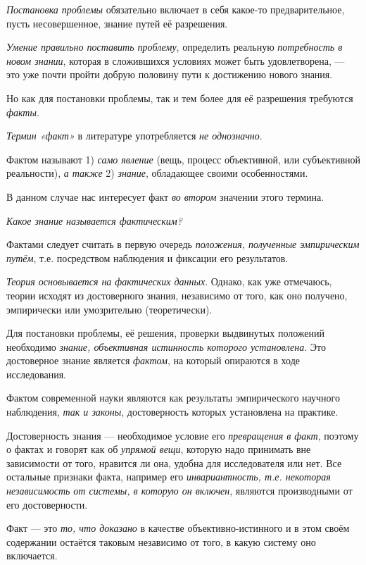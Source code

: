 \documentclass[a4paper,14pt,russian]{extreport}
\begin{document}
\emph{Постановка проблемы} обязательно включает в себя какое-то предварительное, пусть несовершенное, знание путей её разрешения.

\emph{Умение правильно поставить проблему}, определить реальную \emph{потребность в новом знании}, которая в сложившихся условиях может быть удовлетворена, --- это уже почти пройти добрую половину пути к достижению нового знания.

Но как для постановки проблемы, так и тем более для её разрешения требуются \emph{факты}.

\emph{Термин «факт»} в литературе употребляется \emph{не однозначно}.

Фактом называют 1) \emph{само явление} (вещь, процесс объективной, или субъективной реальности), \emph{а также} 2) \emph{знание}, обладающее своими особенностями.

В данном случае нас интересует факт \emph{во втором} значении этого термина.

\emph{Какое знание называется фактическим?}

Фактами следует считать в первую очередь \emph{положения, полученные эмпирическим путём}, т.е. посредством наблюдения и фиксации его результатов.

\emph{Теория основывается на фактических данных}. Однако, как уже отмечаюсь, теории исходят из достоверного знания, независимо от того, как оно получено, эмпирически или умозрительно (теоретически).

Для постановки проблемы, её решения, проверки выдвинутых положений необходимо \emph{знание, объективная истинность которого установлена}. Это достоверное знание является \emph{фактом}, на который опираются в ходе исследования.

Фактом современной науки являются как результаты эмпирического научного наблюдения, \emph{так и законы}, достоверность которых установлена на практике.

Достоверность знания --- необходимое условие его \emph{превращения в факт}, поэтому о фактах и говорят как об \emph{упрямой вещи}, которую надо принимать вне зависимости от того, нравится ли она, удобна для исследователя или нет. Все остальные признаки факта, например его \emph{инвариантность, т.е. некоторая независимость от системы, в которую он включен}, являются производными от его достоверности.

Факт --- это \emph{то, что доказано} в качестве объективно-истинного и в этом своём содержании остаётся таковым независимо от того, в какую систему оно включается.
\end{document}
